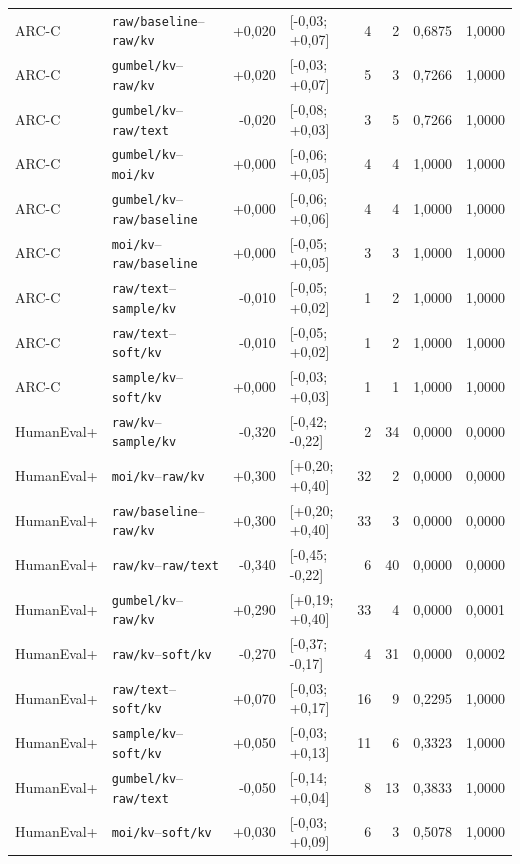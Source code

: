 \begin{longtable}{llrlrrrr}
ARC-C & \texttt{raw/baseline}--\texttt{raw/kv} & +0,020 & [-0,03; +0,07] & 4 & 2 & 0,6875 & 1,0000 \\
ARC-C & \texttt{gumbel/kv}--\texttt{raw/kv} & +0,020 & [-0,03; +0,07] & 5 & 3 & 0,7266 & 1,0000 \\
ARC-C & \texttt{gumbel/kv}--\texttt{raw/text} & -0,020 & [-0,08; +0,03] & 3 & 5 & 0,7266 & 1,0000 \\
ARC-C & \texttt{gumbel/kv}--\texttt{moi/kv} & +0,000 & [-0,06; +0,05] & 4 & 4 & 1,0000 & 1,0000 \\
ARC-C & \texttt{gumbel/kv}--\texttt{raw/baseline} & +0,000 & [-0,06; +0,06] & 4 & 4 & 1,0000 & 1,0000 \\
ARC-C & \texttt{moi/kv}--\texttt{raw/baseline} & +0,000 & [-0,05; +0,05] & 3 & 3 & 1,0000 & 1,0000 \\
ARC-C & \texttt{raw/text}--\texttt{sample/kv} & -0,010 & [-0,05; +0,02] & 1 & 2 & 1,0000 & 1,0000 \\
ARC-C & \texttt{raw/text}--\texttt{soft/kv} & -0,010 & [-0,05; +0,02] & 1 & 2 & 1,0000 & 1,0000 \\
ARC-C & \texttt{sample/kv}--\texttt{soft/kv} & +0,000 & [-0,03; +0,03] & 1 & 1 & 1,0000 & 1,0000 \\
\hline
HumanEval+ & \texttt{raw/kv}--\texttt{sample/kv} & -0,320 & [-0,42; -0,22] & 2 & 34 & 0,0000 & 0,0000 \\
HumanEval+ & \texttt{moi/kv}--\texttt{raw/kv} & +0,300 & [+0,20; +0,40] & 32 & 2 & 0,0000 & 0,0000 \\
HumanEval+ & \texttt{raw/baseline}--\texttt{raw/kv} & +0,300 & [+0,20; +0,40] & 33 & 3 & 0,0000 & 0,0000 \\
HumanEval+ & \texttt{raw/kv}--\texttt{raw/text} & -0,340 & [-0,45; -0,22] & 6 & 40 & 0,0000 & 0,0000 \\
HumanEval+ & \texttt{gumbel/kv}--\texttt{raw/kv} & +0,290 & [+0,19; +0,40] & 33 & 4 & 0,0000 & 0,0001 \\
HumanEval+ & \texttt{raw/kv}--\texttt{soft/kv} & -0,270 & [-0,37; -0,17] & 4 & 31 & 0,0000 & 0,0002 \\
HumanEval+ & \texttt{raw/text}--\texttt{soft/kv} & +0,070 & [-0,03; +0,17] & 16 & 9 & 0,2295 & 1,0000 \\
HumanEval+ & \texttt{sample/kv}--\texttt{soft/kv} & +0,050 & [-0,03; +0,13] & 11 & 6 & 0,3323 & 1,0000 \\
HumanEval+ & \texttt{gumbel/kv}--\texttt{raw/text} & -0,050 & [-0,14; +0,04] & 8 & 13 & 0,3833 & 1,0000 \\
HumanEval+ & \texttt{moi/kv}--\texttt{soft/kv} & +0,030 & [-0,03; +0,09] & 6 & 3 & 0,5078 & 1,0000 \\

\end{longtable}

